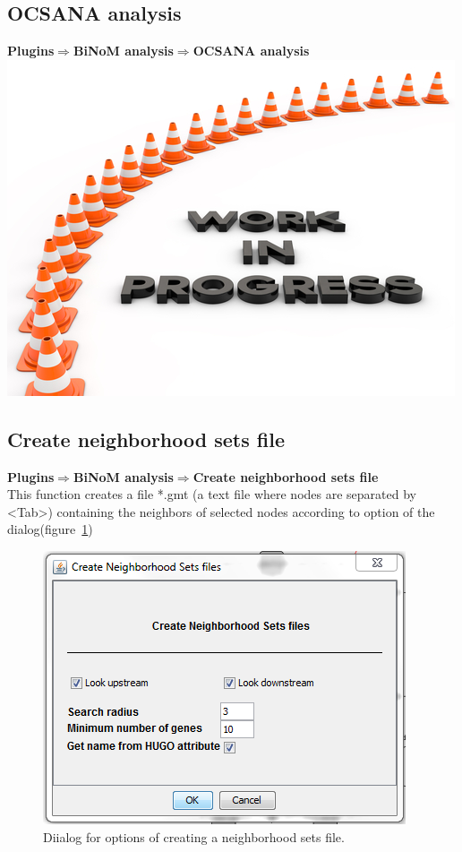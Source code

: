 \subsection{OCSANA analysis}
\textbf{Plugins$\Rightarrow$BiNoM analysis$\Rightarrow$OCSANA analysis}\\
\includegraphics{graphics/work_in_progress}

\subsection{Create neighborhood sets file}
\textbf{Plugins$\Rightarrow$BiNoM analysis$\Rightarrow$Create neighborhood sets file}\\
This function creates a file *.gmt (a text file where nodes are separated by \textless Tab\textgreater) containing the neighbors of selected nodes according to option of the dialog(figure~\ref{Create_Neigborhood_File_Dialog})
\begin{figure}
\centering
\includegraphics[width=7 cm]{graphics/Create_Neigborhood_File_Dialog}
\caption{Diialog for options of creating a neighborhood sets file.}
\label{Create_Neigborhood_File_Dialog}
\end{figure}  